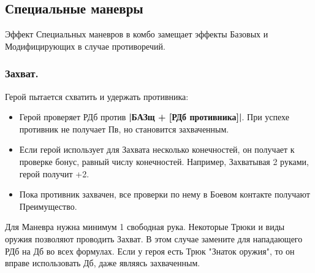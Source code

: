 \subsection{Специальные маневры}
Эффект Специальных маневров в комбо замещает эффекты Базовых и Модифицирующих в случае противоречий.

\subsubsection{Захват.}
Герой пытается схватить и удержать противника:
\begin{itemize}
  \item Герой проверяет РДб против \textbf{|БАЗщ + [РДб противника]|}. При успехе противник не получает Пв, но становится захваченным.
  \item Если герой использует для Захвата несколько конечностей, он получает к проверке бонус, равный числу конечностей. Например, Захватывая 2 руками, герой получит +2.
  \item Пока противник захвачен, все проверки по нему в Боевом контакте получают Преимущество.
\end{itemize}
Для Маневра нужна минимум 1 свободная рука. Некоторые Трюки и виды оружия позволяют проводить Захват. В этом случае замените для нападающего РДб на Дб во всех формулах.
\newline Если у героя есть Трюк "Знаток оружия", то он вправе использовать Дб, даже являясь захваченным.

